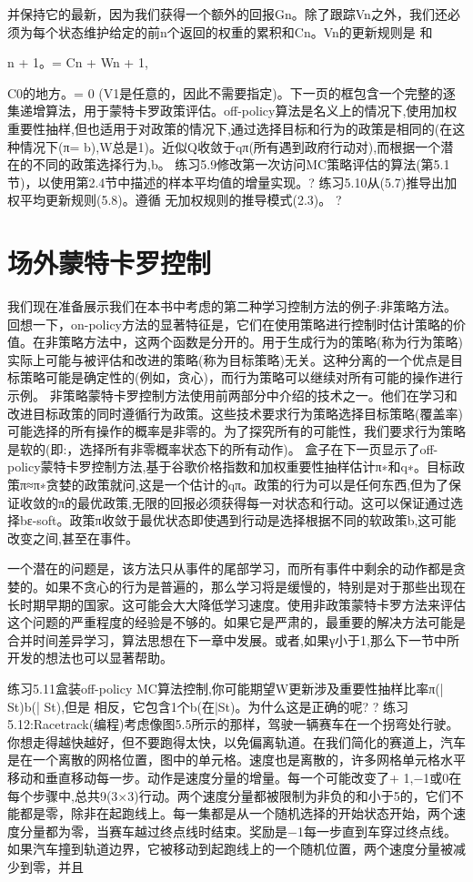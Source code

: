 并保持它的最新，因为我们获得一个额外的回报Gn。除了跟踪Vn之外，我们还必须为每个状态维护给定的前n个返回的权重的累积和Cn。Vn的更新规则是
和

n + 1。= Cn + Wn + 1,

C0的地方。= 0 (V1是任意的，因此不需要指定)。下一页的框包含一个完整的逐集递增算法，用于蒙特卡罗政策评估。off-policy算法是名义上的情况下,使用加权重要性抽样,但也适用于对政策的情况下,通过选择目标和行为的政策是相同的(在这种情况下(π= b),W总是1)。近似Q收敛于qπ(所有遇到政府行动对),而根据一个潜在的不同的政策选择行为,b。
练习5.9修改第一次访问MC策略评估的算法(第5.1节)，以使用第2.4节中描述的样本平均值的增量实现。?
练习5.10从(5.7)推导出加权平均更新规则(5.8)。遵循
无加权规则的推导模式(2.3)。 					?

\section{场外蒙特卡罗控制}

我们现在准备展示我们在本书中考虑的第二种学习控制方法的例子:非策略方法。回想一下，on-policy方法的显著特征是，它们在使用策略进行控制时估计策略的价值。在非策略方法中，这两个函数是分开的。用于生成行为的策略(称为行为策略)实际上可能与被评估和改进的策略(称为目标策略)无关。这种分离的一个优点是目标策略可能是确定性的(例如，贪心)，而行为策略可以继续对所有可能的操作进行示例。
非策略蒙特卡罗控制方法使用前两部分中介绍的技术之一。他们在学习和改进目标政策的同时遵循行为政策。这些技术要求行为策略选择目标策略(覆盖率)可能选择的所有操作的概率是非零的。为了探究所有的可能性，我们要求行为策略是软的(即:，选择所有非零概率状态下的所有动作)。
盒子在下一页显示了off-policy蒙特卡罗控制方法,基于谷歌价格指数和加权重要性抽样估计π∗和q∗。目标政策π≈π∗贪婪的政策就问,这是一个估计的qπ。政策的行为可以是任何东西,但为了保证收敛的π的最优政策,无限的回报必须获得每一对状态和行动。这可以保证通过选择bε-soft。政策π收敛于最优状态即使遇到行动是选择根据不同的软政策b,这可能改变之间,甚至在事件。

一个潜在的问题是，该方法只从事件的尾部学习，而所有事件中剩余的动作都是贪婪的。如果不贪心的行为是普遍的，那么学习将是缓慢的，特别是对于那些出现在长时期早期的国家。这可能会大大降低学习速度。使用非政策蒙特卡罗方法来评估这个问题的严重程度的经验是不够的。如果它是严肃的，最重要的解决方法可能是合并时间差异学习，算法思想在下一章中发展。或者,如果γ小于1,那么下一节中所开发的想法也可以显著帮助。

练习5.11盒装off-policy MC算法控制,你可能期望W更新涉及重要性抽样比率π(| St)b(| St),但是
相反，它包含1个b(在|St)。为什么这是正确的呢? 					?
练习5.12:Racetrack(编程)考虑像图5.5所示的那样，驾驶一辆赛车在一个拐弯处行驶。你想走得越快越好，但不要跑得太快，以免偏离轨道。在我们简化的赛道上，汽车是在一个离散的网格位置，图中的单元格。速度也是离散的，许多网格单元格水平移动和垂直移动每一步。动作是速度分量的增量。每一个可能改变了+ 1,−1或0在每个步骤中,总共9(3×3)行动。两个速度分量都被限制为非负的和小于5的，它们不能都是零，除非在起跑线上。每一集都是从一个随机选择的开始状态开始，两个速度分量都为零，当赛车越过终点线时结束。奖励是−1每一步直到车穿过终点线。如果汽车撞到轨道边界，它被移动到起跑线上的一个随机位置，两个速度分量被减少到零，并且

